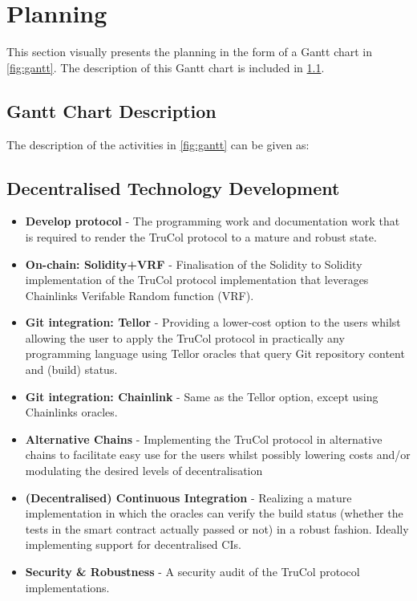 \section{Planning}\label{sec:results}
This section visually presents the planning in the form of a Gantt chart in \cref{fig:gantt}. The description of this Gantt chart is included in \cref{subsec:gantt_description}.

\subsection{Gantt Chart Description}\label{subsec:gantt_description}
The description of the activities in \cref{fig:gantt} can be given as:
\subsection{Decentralised Technology Development}
\begin{itemize}
	\item \textbf{Develop protocol} - The programming work and documentation work that is required to render the TruCol protocol to a mature and robust state.
	\item \textbf{On-chain: Solidity+VRF} - Finalisation of the Solidity to Solidity implementation of the TruCol protocol implementation that leverages Chainlinks Verifable Random function (VRF).
	\item \textbf{Git integration: Tellor} - Providing a lower-cost option to the users whilst allowing the user to apply the TruCol protocol in practically any programming language using Tellor oracles that query Git repository content and (build) status.
	\item \textbf{Git integration: Chainlink} - Same as the Tellor option, except using Chainlinks oracles.
	\item \textbf{Alternative Chains} - Implementing the TruCol protocol in alternative chains to facilitate easy use for the users whilst possibly lowering costs and/or modulating the desired levels of decentralisation
	\item \textbf{(Decentralised) Continuous Integration} - Realizing a mature implementation in which the oracles can verify the build status (whether the tests in the smart contract actually passed or not) in a robust fashion. Ideally implementing support for decentralised CIs.
	\item \textbf{Security \& Robustness} - A security audit of the TruCol protocol implementations.
\end{itemize}
